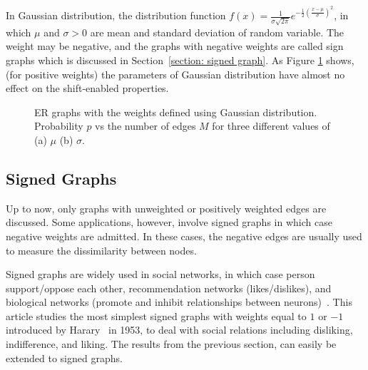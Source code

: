 \documentclass[journal]{IEEEtran}
\begin{document}
In Gaussian distribution, the distribution function $ f(x)={\frac {1}{\sigma {\sqrt {2\pi }}}}e^{-{\frac {1}{2}}\left({\frac {x-\mu }{\sigma }}\right)^{2}} $, in which $\mu$ and $\sigma>0$ are mean and standard deviation of random variable. The weight may be negative, and the graphs with negative weights are called sign graphs which is discussed in Section~\ref{section: signed graph}. As Figure \ref{fig:ergaussiannode20sigama10lap} shows, (for positive weights) the parameters of Gaussian distribution have almost no effect on the shift-enabled properties.
\begin{figure}[htb]
	\centering
	\centering
	\caption{ER graphs with the weights defined using Gaussian distribution. Probability $p$ vs the number of edges $M$ for three different values of (a) $\mu$ (b) $\sigma$.}
	\label{fig:ergaussiannode20sigama10lap}
\end{figure}

\subsection{Signed Graphs}{\label{section: signed graph}}
Up to now, only graphs with unweighted or positively weighted edges are discussed. Some applications, however, involve signed graphs in which case negative weights are admitted.
In these cases, the negative edges are usually used to measure the dissimilarity between nodes. 

Signed graphs are widely used in social networks, in which case person support/oppose each other, recommendation networks (likes/dislikes), and biological networks (promote and inhibit relationships between neurons)~\cite{cheung2018robust,parisien2008solving,Dittrich20200signedgraph}. This article studies the most simplest signed graphs with weights equal to $1$ or $-1$ introduced by Harary~\cite{harary1953notion} in 1953, to deal with social relations including  disliking, indifference, and liking. The results from the previous section, can easily be extended to signed graphs.
\end{document}
